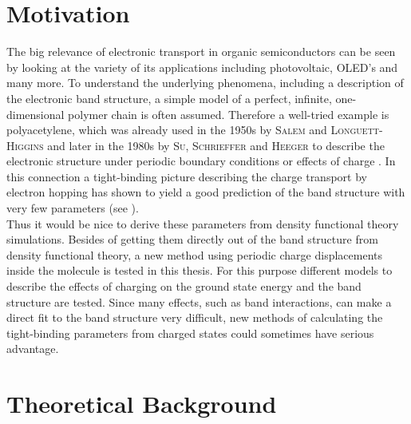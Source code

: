 \section{Motivation}
The big relevance of electronic transport in organic semiconductors can be seen by looking at the variety of its applications including photovoltaic, OLED's and many more. To understand the underlying phenomena, including a description of the electronic band structure, a simple model of a perfect, infinite, one-dimensional polymer chain is often assumed. Therefore a well-tried example is polyacetylene, which was already used in the 1950s by \textsc{Salem} and \textsc{Longuett-Higgins} and later in the 1980s by \textsc{Su, Schrieffer} and \textsc{Heeger} to describe the electronic structure under periodic boundary conditions or effects of charge . In this connection a tight-binding picture describing the charge transport by electron hopping has shown to yield a good prediction of the band structure with very few parameters (see \cite{koehler2015electronic,Longuet-Higgins172,PhysRevLett.42.1698}).\\
Thus it would be nice to derive these parameters from density functional theory simulations. Besides of getting them directly out of the band structure from density functional theory, a new method using periodic charge displacements inside the molecule is tested in this thesis. For this purpose different models to describe the effects of charging on the ground state energy and the band structure are tested. Since many effects, such as band interactions, can make a direct fit to the band structure very difficult, new methods of calculating the tight-binding parameters from charged states could sometimes have serious advantage.

\section{Theoretical Background}

